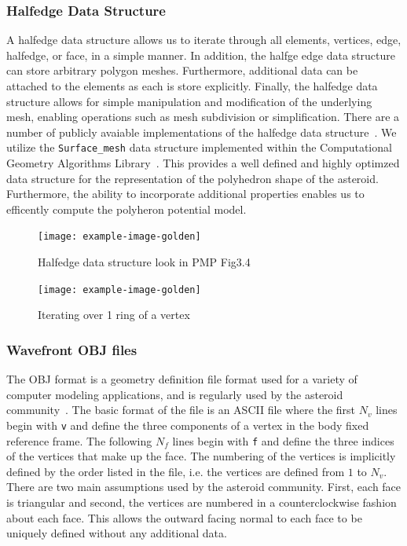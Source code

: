 \subsubsection{Halfedge Data Structure}\label{sec:halfedge_data_structure}
A halfedge data structure allows us to iterate through all elements, vertices, edge, halfedge, or face, in a simple manner.
In addition, the halfge edge data structure can store arbitrary polygon meshes.
Furthermore, additional data can be attached to the elements as each is store explicitly.
Finally, the halfedge data structure allows for simple manipulation and modification of the underlying mesh, enabling operations such as mesh subdivision or simplification.
There are a number of publicly avaiable implementations of the halfedge data structure~\cite{cgalproject2018,botsch2002}.
We utilize the \texttt{Surface\_mesh} data structure implemented within the Computational Geometry Algorithms Library~\cite{sieger2011}.
This provides a well defined and highly optimzed data structure for the representation of the polyhedron shape of the asteroid.
Furthermore, the ability to incorporate additional properties enables us to efficently compute the polyheron potential model.
\begin{figure}
    \centering
    \texttt{[image: example-image-golden]}
    \caption{Halfedge data structure look in PMP Fig3.4~\label{fig:halfedge_data_structure}}
\end{figure}

\begin{figure}
    \centering
    \texttt{[image: example-image-golden]}
    \caption{Iterating over 1 ring of a vertex}
\end{figure}

\subsubsection{Wavefront OBJ files}
The OBJ format is a geometry definition file format used for a variety of computer modeling applications, and is regularly used by the asteroid community~\cite{neese2004}.
The basic format of the file is an ASCII file where the first \( N_v\) lines begin with \texttt{v} and define the three components of a vertex in the body fixed reference frame.
The following \( N_f\) lines begin with \texttt{f} and define the three indices of the vertices that make up the face.
The numbering of the vertices is implicitly defined by the order listed in the file, i.e. the vertices are defined from \( 1 \) to \( N_v\).
There are two main assumptions used by the asteroid community.
First, each face is triangular and second, the vertices are numbered in a counterclockwise fashion about each face.
This allows the outward facing normal to each face to be uniquely defined without any additional data.

